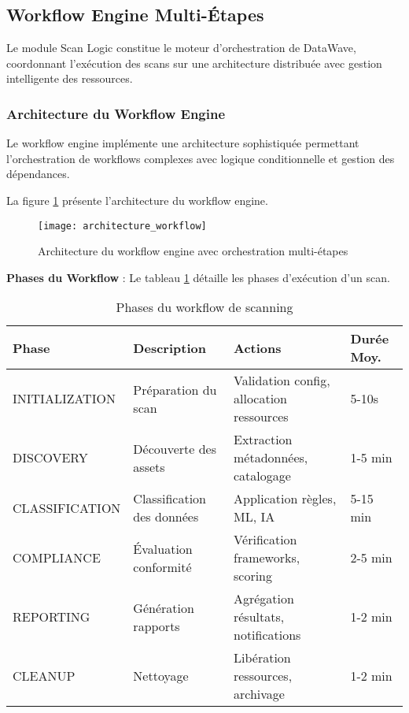 \subsection{Workflow Engine Multi-Étapes}

Le module Scan Logic constitue le moteur d'orchestration de DataWave, coordonnant l'exécution des scans sur une architecture distribuée avec gestion intelligente des ressources.

\subsubsection{Architecture du Workflow Engine}

Le workflow engine implémente une architecture sophistiquée permettant l'orchestration de workflows complexes avec logique conditionnelle et gestion des dépendances.

La figure \ref{fig:architecture_workflow} présente l'architecture du workflow engine.

\begin{figure}[htpb]
\centering
\texttt{[image: architecture\_workflow]}
\caption{Architecture du workflow engine avec orchestration multi-étapes}
\label{fig:architecture_workflow}
\end{figure}

\textbf{Phases du Workflow} : Le tableau \ref{tab:phases_workflow} détaille les phases d'exécution d'un scan.

\begin{table}[htpb]
\centering
\caption{Phases du workflow de scanning}
\label{tab:phases_workflow}
\begin{tabular}{|p{}|p{}|p{}|p{}|}
\hline
\textbf{Phase} & \textbf{Description} & \textbf{Actions} & \textbf{Durée Moy.} \\
\hline
INITIALIZATION & Préparation du scan & Validation config, allocation ressources & 5-10s \\
\hline
DISCOVERY & Découverte des assets & Extraction métadonnées, catalogage & 1-5 min \\
\hline
CLASSIFICATION & Classification des données & Application règles, ML, IA & 5-15 min \\
\hline
COMPLIANCE & Évaluation conformité & Vérification frameworks, scoring & 2-5 min \\
\hline
REPORTING & Génération rapports & Agrégation résultats, notifications & 1-2 min \\
\hline
CLEANUP & Nettoyage & Libération ressources, archivage & 1-2 min \\
\hline
\end{tabular}
\end{table}

